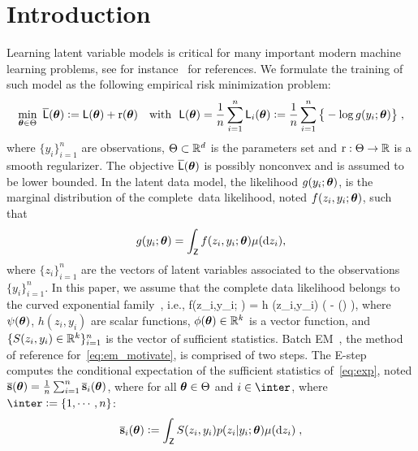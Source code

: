 \documentclass[12pt]{article}
\begin{document}
\newpage

\section{Introduction}


Learning latent variable models is critical for many important modern machine learning problems, see for instance~\citet{mclachlan2007algorithm} for references.
We formulate the training of such model as the following {empirical risk minimization} problem:
\begin{align} \label{eq:em_motivate}
\begin{split} 
 \min_{ {\bm{\theta}} \in \Theta }~ \overline{{\textsf{L}}} ( {\bm{\theta}} ) \mathrel{\mathop:}=  {\textsf{L}} ( {\bm{\theta}} ) + \operatorname{r} ({\bm{\theta}}) \quad \text{with}~~{\textsf{L}} ( {\bm{\theta}} ) = \frac{1}{n} \sum_{i=1}^n {\textsf{L}}_i( {\bm{\theta}}) \mathrel{\mathop:}=  \frac{1}{n} \sum_{i=1}^n \big\{ - \log g( y_i ; {\bm{\theta}} ) \big\}\;,
\end{split} 
\end{align}
where $\{y_i\}_{i=1}^n$ are observations, $\Theta \subset \mathbb{R}^d$ is the parameters set and $\operatorname{r} : \Theta \rightarrow \mathbb{R}$ is a smooth regularizer.
The objective $ \overline{{\textsf{L}}} ( {\bm{\theta}} )$ is possibly {nonconvex} and is assumed to be lower bounded. 
In the latent data model, the likelihood $g(y_i ; {\bm{\theta}})$, is the marginal distribution of the complete~data likelihood, noted $f(z_i,y_i; {\bm{\theta}})$, such that 
\begin{align}
g(y_i; {\bm{\theta}}) = \int_{\mathsf{Z}} f (z_i,y_i;{\bm{\theta}}) \mu(\mathrm d z_i),    
\end{align}
where $\{ z_i \}_{i=1}^n$ are the vectors of latent variables associated to the observations $\{y_i\}_{i=1}^n$.
In this paper, we assume that the complete data likelihood belongs to the curved exponential family~\citep{efron1975defining}, i.e.,
\beq \label{eq:exp}
f(z_i,y_i; \param) = h  (z_i,y_i) \exp (  - \psi(\param) )\eqs,
\eeq
where $\psi({\bm{\theta}})$, $h(z_i,y_i)$ are scalar functions, $\phi({\bm{\theta}}) \in \mathbb{R}^k$ is a vector function, and $\{S(z_i,y_i) \in \mathbb{R}^k\}_{i=1}^n$ is the vector of sufficient statistics.
Batch EM~\citep{dempster1977Maximum, wu1983convergence}, the method of reference for~\eqref{eq:em_motivate}, is comprised of two steps. 
The {E-step} computes the conditional expectation of the sufficient statistics of~\eqref{eq:exp}, noted $\overline{{\mathbf{s}}}({\bm{\theta}})= \frac{1}{n} \sum_{i=1}^n \overline{{\mathbf{s}}}_i({\bm{\theta}})$, where for all ${\bm{\theta}} \in \Theta$ and $i \in \inter$, where $\inter \eqdef \{1, \cdots, n\}$:
\begin{align}\label{eq:definition-overline-bss}
 \overline{{\mathbf{s}}}_i({\bm{\theta}}) \mathrel{\mathop:}= \int_{\mathsf{Z}} S(z_i,y_i) p(z_i|y_i;{\bm{\theta}}) \mu(\mathrm d z_i) \;,
\end{align}
\end{document}

